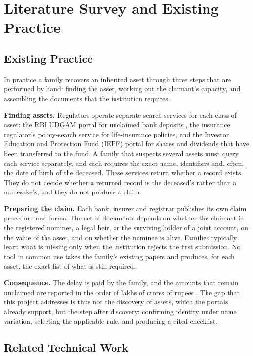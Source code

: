 \chapter{Literature Survey and Existing Practice}
\section{Existing Practice}
In practice a family recovers an inherited asset through three steps that are performed by hand: finding the asset, working out the claimant's capacity, and assembling the documents that the institution requires.

\textbf{Finding assets.} Regulators operate separate search services for each class of asset: the RBI UDGAM portal for unclaimed bank deposits \cite{rbi_udgam}, the insurance regulator's policy-search service for life-insurance policies, and the Investor Education and Protection Fund (IEPF) portal for shares and dividends that have been transferred to the fund. A family that suspects several assets must query each service separately, and each requires the exact name, identifiers and, often, the date of birth of the deceased. These services return whether a record exists. They do not decide whether a returned record is the deceased's rather than a namesake's, and they do not produce a claim.

\textbf{Preparing the claim.} Each bank, insurer and registrar publishes its own claim procedure and forms. The set of documents depends on whether the claimant is the registered nominee, a legal heir, or the surviving holder of a joint account, on the value of the asset, and on whether the nominee is alive. Families typically learn what is missing only when the institution rejects the first submission. No tool in common use takes the family's existing papers and produces, for each asset, the exact list of what is still required.

\textbf{Consequence.} The delay is paid by the family, and the amounts that remain unclaimed are reported in the order of lakhs of crores of rupees \cite{lapaas2026,bt2026}. The gap that this project addresses is thus not the discovery of assets, which the portals already support, but the step after discovery: confirming identity under name variation, selecting the applicable rule, and producing a cited checklist.

\section{Related Technical Work}

